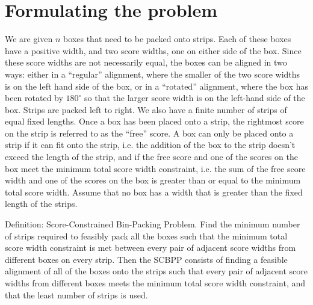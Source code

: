 \documentclass[oribibl]{llncs}
\begin{document}
\section{Formulating the problem}
We are given $n$ boxes that need to be packed onto strips. Each of these boxes have a positive width, and two score widths, one on either side of the box. Since these score widths are not necessarily equal, the boxes can be aligned in two ways: either in a ``regular'' alignment, where the smaller of the two score widths is on the left hand side of the box, or in a ``rotated'' alignment, where the box has been rotated by $180^{\circ}$ so that the larger score width is on the left-hand side of the box. Strips are packed left to right. We also have a finite number of strips of equal fixed lengths. Once a box has been placed onto a strip, the rightmost score on the strip is referred to as the ``free'' score. A box can only be placed onto a strip if it can fit onto the strip, i.e. the addition of the box to the strip doesn't exceed the length of the strip, and if the free score and one of the scores on the box meet the minimum total score width constraint, i.e. the sum of the free score width and one of the scores on the box is greater than or equal to the minimum total score width. Assume that no box has a width that is greater than the fixed length of the strips.

Definition: Score-Constrained Bin-Packing Problem. Find the minimum number of strips required to feasibly pack all the boxes such that the minimum total score width constraint is met between every pair of adjacent score widths from different boxes on every strip. Then the SCBPP consists of finding a feasible alignment of all of the boxes onto the strips such that every pair of adjacent score widths from different boxes meets the minimum total score width constraint, and that the least number of strips is used.
\end{document}
